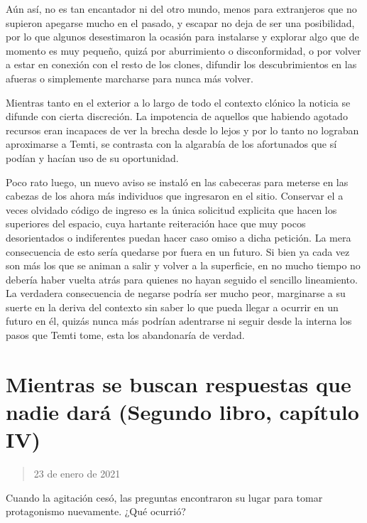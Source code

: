 \documentclass[
]{book}
\begin{document}
Aún así, no es tan encantador ni del otro mundo, menos para extranjeros que no supieron apegarse mucho en el pasado, y escapar no deja de ser una posibilidad, por lo que algunos desestimaron la ocasión para instalarse y explorar algo que de momento es muy pequeño, quizá por aburrimiento o disconformidad, o por volver a estar en conexión con el resto de los clones, difundir los descubrimientos en las afueras o simplemente marcharse para nunca más volver.

Mientras tanto en el exterior a lo largo de todo el contexto clónico la noticia se difunde con cierta discreción. La impotencia de aquellos que habiendo agotado recursos eran incapaces de ver la brecha desde lo lejos y por lo tanto no lograban aproximarse a Temti, se contrasta con la algarabía de los afortunados que sí podían y hacían uso de su oportunidad.

Poco rato luego, un nuevo aviso se instaló en las cabeceras para meterse en las cabezas de los ahora más individuos que ingresaron en el sitio. Conservar el a veces olvidado código de ingreso es la única solicitud explicita que hacen los superiores del espacio, cuya hartante reiteración hace que muy pocos desorientados o indiferentes puedan hacer caso omiso a dicha petición. La mera consecuencia de esto sería quedarse por fuera en un futuro. Si bien ya cada vez son más los que se animan a salir y volver a la superficie, en no mucho tiempo no debería haber vuelta atrás para quienes no hayan seguido el sencillo lineamiento. La verdadera consecuencia de negarse podría ser mucho peor, marginarse a su suerte en la deriva del contexto sin saber lo que pueda llegar a ocurrir en un futuro en él, quizás nunca más podrían adentrarse ni seguir desde la interna los pasos que Temti tome, esta los abandonaría de verdad.

\hypertarget{mientras-se-buscan-respuestas-que-nadie-daruxe1-segundo-libro-capuxedtulo-iv}{%
\section{Mientras se buscan respuestas que nadie dará (Segundo libro, capítulo IV)}\label{mientras-se-buscan-respuestas-que-nadie-daruxe1-segundo-libro-capuxedtulo-iv}}

\begin{quote}
23 de enero de 2021
\end{quote}

Cuando la agitación cesó, las preguntas encontraron su lugar para tomar protagonismo nuevamente. ¿Qué ocurrió?
\end{document}
